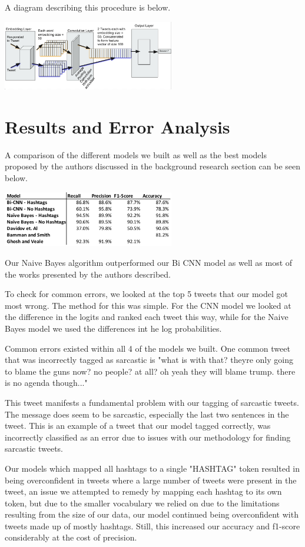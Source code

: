 \documentclass[11pt,a4paper]{article}
\begin{document}
A diagram describing this procedure is below.

\includegraphics[width=75mm,scale=0.5]{bcnn.png}


\section{Results and Error Analysis}

A comparison of the different models we built as well as the best models proposed by the authors discussed in the background research section can be seen below.

\includegraphics[width=75mm,scale=0.5]{results.png}

Our Naive Bayes algorithm outperformed our Bi CNN model as well as most of the works presented by the authors described.

To check for common errors, we looked at the top 5 tweets that our model got most wrong. The method for this was simple. For the CNN model we looked at the difference in the logits and ranked each tweet this way, while for the Naive Bayes model we used the differences int he log probabilities. 

Common errors existed within all 4 of the models we built. One common tweet that was incorrectly tagged as sarcastic is "what is with that? theyre only going to blame the guns now? no people? at all? oh yeah they will blame trump. there is no agenda though..."

This tweet manifests a fundamental problem with our tagging of sarcastic tweets. The message does seem to be sarcastic, especially the last two sentences in the tweet. This is an example of a tweet that our model tagged correctly, was incorrectly classified as an error due to issues with our methodology for finding sarcastic tweets. 

Our models which mapped all hashtags to a single "HASHTAG" token resulted in being overconfident in tweets where a large number of tweets were present in the tweet, an issue we attempted to remedy by mapping each hashtag to its own token, but due to the smaller vocabulary we relied on due to the limitations resulting from the size of our data, our model continued being overconfident with tweets made up of mostly hashtags. Still, this increased our accuracy and f1-score considerably at the cost of precision.
\end{document}
